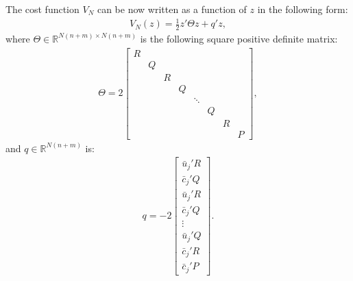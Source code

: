 \documentclass[12pt]{scrartcl}
\renewcommand{\Re}{\mathbb{R}}
\newcommand{\bcj}{\bar{c}_j}
\newcommand{\buj}{\bar{u}_j}
\begin{document}
The cost function $V_N$ can be now written as a function of $z$ in the following
form:
\begin{align}
V_N(z) = \frac{1}{2}z' \Theta z + q'z,
\end{align}
where $\Theta\in\Re^{N(n+m)\times N(n+m)}$ is the following square positive definite matrix:
\begin{align}
\Theta=2\left[
\begin{array}{cccccccc}
R\\
&Q\\
&&R\\
&&&Q\\
&&&&\ddots\\
&&&&&Q\\
&&&&&&R\\
&&&&&&&P
\end{array}\right],
\end{align}
and $q\in \Re^{N(n+m)}$ is:
\begin{align}
q=-2\left[
\begin{array}{c}
\buj' R\\
\bcj' Q\\
\buj' R\\
\bcj' Q\\
\vdots\\
\buj' Q\\
\bcj' R\\
\bcj' P
\end{array}\right].
\end{align}
\end{document}
